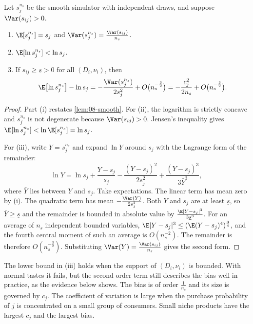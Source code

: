 \begin{proposition}\label{prop:08-simbias}
Let $s^{n_s}_j$ be the smooth simulator with independent draws, and suppose $\Var(s_{ij}) > 0$.
\begin{enumerate}[label=(\roman*)]
  \item $\E[s^{n_s}_j] = s_j$ and $\Var(s^{n_s}_j) = \frac{\Var(s_{ij})}{n_s}$.
  \item $\E[\ln s^{n_s}_j] < \ln s_j$.
  \item If $s_{ij} \ge \underline{s} > 0$ for all $(D_i, \nu_i)$, then
    \begin{equation}\label{eq:08-simbias}
      \E\bigl[\ln s^{n_s}_j\bigr] - \ln s_j = -\frac{\Var(s^{n_s}_j)}{2s_j^2} + O\bigl(n_s^{-\frac{3}{2}}\bigr)
      = -\frac{c_j^2}{2n_s} + O\bigl(n_s^{-\frac{3}{2}}\bigr).
    \end{equation}
\end{enumerate}
\end{proposition}

\begin{proof}
Part (i) restates \cref{lem:08-smooth}. For (ii), the logarithm is strictly concave and $s^{n_s}_j$ is not
degenerate because $\Var(s_{ij}) > 0$. Jensen's inequality gives $\E[\ln s^{n_s}_j] < \ln\E[s^{n_s}_j] = \ln s_j$.

For (iii), write $Y = s^{n_s}_j$ and expand $\ln Y$ around $s_j$ with the Lagrange form of the remainder:
\begin{equation*}
  \ln Y = \ln s_j + \frac{Y - s_j}{s_j} - \frac{(Y - s_j)^2}{2s_j^2} + \frac{(Y - s_j)^3}{3\bar Y^3},
\end{equation*}
where $\bar Y$ lies between $Y$ and $s_j$. Take expectations. The linear term has mean zero by (i). The quadratic
term has mean $-\frac{\Var(Y)}{2s_j^2}$. Both $Y$ and $s_j$ are at least $\underline{s}$, so $\bar Y \ge
\underline{s}$ and the remainder is bounded in absolute value by $\frac{\E|Y - s_j|^3}{3\underline{s}^3}$. For an
average of $n_s$ independent bounded variables, $\E|Y - s_j|^3 \le (\E(Y - s_j)^4)^{\frac{3}{4}}$, and the fourth
central moment of such an average is $O(n_s^{-2})$. The remainder is therefore $O(n_s^{-\frac{3}{2}})$.
Substituting $\Var(Y) = \frac{\Var(s_{ij})}{n_s}$ gives the second form.
\end{proof}

The lower bound in (iii) holds when the support of $(D_i, \nu_i)$ is bounded. With normal tastes it fails, but the
second-order term still describes the bias well in practice, as the evidence below shows. The bias is of order
$\frac{1}{n_s}$ and its size is governed by $c_j$. The coefficient of variation is large when the purchase
probability of $j$ is concentrated on a small group of consumers. Small niche products have the largest $c_j$ and
the largest bias.

